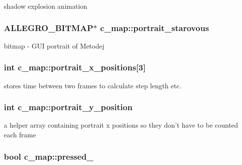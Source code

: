 shadow explosion animation \hypertarget{classc__map_a9801a871513ce172735eb4afe070f184}{
\subsubsection[{portrait\-\_\-starovous}]{\setlength{\rightskip}{0pt plus 5cm}A\-L\-L\-E\-G\-R\-O\-\_\-\-B\-I\-T\-M\-A\-P$\ast$ c\-\_\-map\-::portrait\-\_\-starovous\hspace{0.3cm}{\ttfamily [protected]}}}\label{classc__map_a9801a871513ce172735eb4afe070f184}
bitmap -\/ G\-U\-I portrait of Metodej \hypertarget{classc__map_aeb595cd9e54fd327225d36119f128496}{
\subsubsection[{portrait\-\_\-x\-\_\-positions}]{\setlength{\rightskip}{0pt plus 5cm}int c\-\_\-map\-::portrait\-\_\-x\-\_\-positions\mbox{[}3\mbox{]}\hspace{0.3cm}{\ttfamily [protected]}}}\label{classc__map_aeb595cd9e54fd327225d36119f128496}
stores time between two frames to calculate step length etc. \hypertarget{classc__map_abd86f152d66885aa67f8ec22ac4b3bca}{
\subsubsection[{portrait\-\_\-y\-\_\-position}]{\setlength{\rightskip}{0pt plus 5cm}int c\-\_\-map\-::portrait\-\_\-y\-\_\-position\hspace{0.3cm}{\ttfamily [protected]}}}\label{classc__map_abd86f152d66885aa67f8ec22ac4b3bca}
a helper array containing portrait x positions so they don't have to be counted each frame \hypertarget{classc__map_a05a4919684f8a4d6c10342f4e8231124}{
\subsubsection[{pressed\-\_\-1}]{\setlength{\rightskip}{0pt plus 5cm}bool c\-\_\-map\-::pressed\-\_\hspace{0.3cm}{\ttfamily [protected]}}}\label{classc__map_a05a4919684f8a4d6c10342f4e8231124}
